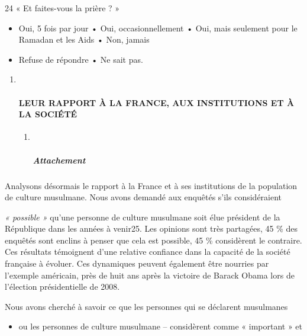24 « Et faites-vous la prière ? »


\begin{itemize}
\item
  Oui, 5 fois par jour • Oui, occasionnellement • Oui, mais seulement
  pour le Ramadan et les Aids • Non, jamais
\item
  Refuse de répondre • Ne sait pas.
\end{itemize}





\begin{enumerate}
\def\labelenumi{\arabic{enumi}.}
\item ~
  \hypertarget{leur-rapport-uxe0-la-france-aux-institutions-et-uxe0-la-sociuxe9tuxe9}{%
  \paragraph{LEUR RAPPORT À LA FRANCE, AUX INSTITUTIONS ET À LA
  SOCIÉTÉ}\label{leur-rapport-uxe0-la-france-aux-institutions-et-uxe0-la-sociuxe9tuxe9}}

  \begin{enumerate}
  \def\labelenumii{\arabic{enumii}.}
  \item ~
    \hypertarget{attachement}{%
    \subparagraph{Attachement}\label{attachement}}
  \end{enumerate}
\end{enumerate}


Analysons désormais le rapport à la France et à ses institutions de la
population de culture musulmane. Nous avons demandé aux enquêtés s'ils
considéraient

\emph{« possible »} qu'une personne de culture musulmane soit élue
président de la République dans les années à venir25. Les opinions sont
très partagées, 45 \% des enquêtés sont enclins à penser que cela est
possible, 45 \% considèrent le contraire. Ces résultats témoignent d'une
relative confiance dans la capacité de la société française à évoluer.
Ces dynamiques peuvent également être nourries par l'exemple américain,
près de huit ans après la victoire de Barack Obama lors de l'élection
présidentielle de 2008.

Nous avons cherché à savoir ce que les personnes qui se déclarent
musulmanes


\begin{itemize}
\item
  
  ou les personnes de culture musulmane -- considèrent comme « important
  » et
  
\end{itemize}


